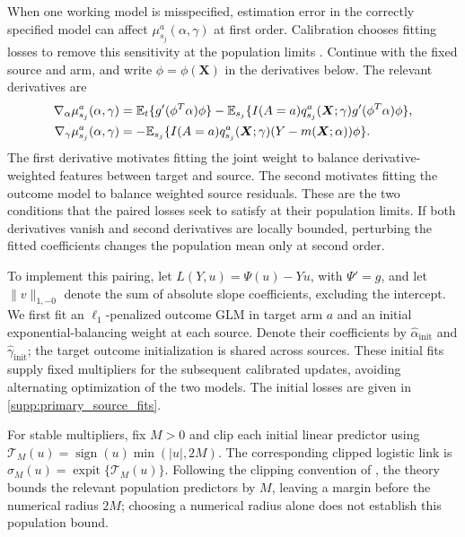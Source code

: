 \documentclass[12pt]{article}
\begin{document}
When one working model is misspecified, estimation error in the correctly specified model can affect $\mu_{s_j}^a(\alpha,\gamma)$ at first order. Calibration chooses fitting losses to remove this sensitivity at the population limits \citep{tan2020model,smucler2019unifying}. Continue with the fixed source and arm, and write $\phi=\phi(\boldsymbol X)$ in the derivatives below. The relevant derivatives are
\begin{equation}\label{eq:main_calibration_derivatives}
\begin{aligned}
\nabla_\alpha\mu_{s_j}^a(\alpha,\gamma)
&=\mathbb{E}_t\{g'(\phi^T\alpha)\phi\}
-\mathbb{E}_{s_j}\{I(A=a)q_{s_j}^a(\boldsymbol X;\gamma) g'(\phi^T\alpha)\phi\},\\
\nabla_\gamma\mu_{s_j}^a(\alpha,\gamma)
&=-\mathbb{E}_{s_j}\{I(A=a)q_{s_j}^a(\boldsymbol X;\gamma)(Y-m(\boldsymbol X;\alpha))\phi\}.
\end{aligned}
\end{equation}
The first derivative motivates fitting the joint weight to balance derivative-weighted features between target and source. The second motivates fitting the outcome model to balance weighted source residuals. These are the two conditions that the paired losses seek to satisfy at their population limits. If both derivatives vanish and second derivatives are locally bounded, perturbing the fitted coefficients changes the population mean only at second order.

To implement this pairing, let $L(Y,u)=\Psi(u)-Yu$, with $\Psi'=g$, and let $\|v\|_{1,-0}$ denote the sum of absolute slope coefficients, excluding the intercept. We first fit an $\ell_1$-penalized outcome GLM in target arm $a$ and an initial exponential-balancing weight at each source. Denote their coefficients by $\widehat\alpha_{\mathrm{init}}$ and $\widehat\gamma_{\mathrm{init}}$; the target outcome initialization is shared across sources. These initial fits supply fixed multipliers for the subsequent calibrated updates, avoiding alternating optimization of the two models. The initial losses are given in \cref{supp:primary_source_fits}.

For stable multipliers, fix $M>0$ and clip each initial linear predictor using $\mathcal T_M(u)=\operatorname{sign}(u)\min(|u|,2M)$. The corresponding clipped logistic link is $\sigma_M(u)=\operatorname{expit}\{\mathcal T_M(u)\}$. Following the clipping convention of \citet{hou2025efficient}, the theory bounds the relevant population predictors by $M$, leaving a margin before the numerical radius $2M$; choosing a numerical radius alone does not establish this population bound.
\end{document}
